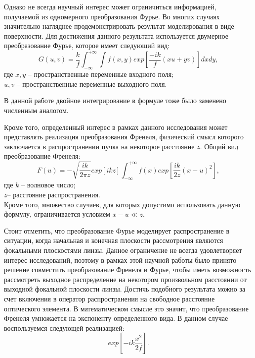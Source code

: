 {    Однако не всегда научный интерес может ограничиться информацией, получаемой из одномерного преобразования Фурье. Во многих случаях значительно нагляднее продемонстрировать результат моделирования в виде поверхности. Для достижения данного результата используется двумерное преобразование Фурье, которое имеет следующий вид:
    \begin{equation}
        \label{2d_four}
        G(u, v) = \frac{k}{f}\int_{-\infty}^{+\infty} \int f(x, y)exp[\frac{-ik}{f}(xu+yv)] dxdy,
    \end{equation}
    \tab    где $x, y$ -- пространственные переменные входного поля;  \\
    \tab \tab \hspace{-0.4cm}$u, v$ -- пространственные переменные выходного поля.

    В данной работе двойное интегрирование в формуле тоже было заменено численным аналогом.

    Кроме того, определенный интерес в рамках данного исследования может представлять реализация преобразования Френеля,
    физический смысл которого заключается в распространении пучка на некоторое расстояние $z$. Общий вид преобразование Френеля:
    \begin{equation}
        \label{fresnel}
        F(u) = - \sqrt{\frac{ik}{2 \pi z}}exp[{ikz}]\int_{-\infty}^{+\infty}f(x) exp[{\frac{ik}{2z}(x - u)^2}],
    \end{equation}
    \tab где $k$ -- волновое число; \\
    \tab \tab\hspace{-0.4cm} $z $-- расстояние распространения.\\
    Кроме того, множество случаев, для которых допустимо использовать данную формулу, ограничивается условием $x-u\ll z$.

    Стоит отметить, что преобразование Фурье моделирует распространение в ситуации,
    когда начальная и конечная плоскости рассмотрения являются фокальными плоскостями линзы.
    Данное ограничение не всегда удовлетворяет интерес исследований,
    поэтому в рамках этой научной работы было принято решение совместить преобразование Френеля и Фурье,
    чтобы иметь возможность рассмотреть выходное распределение на некотором произвольном расстоянии от выходной фокальной плоскости линзы.
    Достичь подобного результата можно за счет включения в оператор распространения на свободное расстояние оптического элемента.
    В математическом смысле это значит, что преобразование Френеля умножается на экспоненту определенного вида.
    В данном случае воспользуемся следующей реализацией:
    \begin{equation*}
        exp[-ik \frac{x^2}{2f} ].
    \end{equation*}

}

